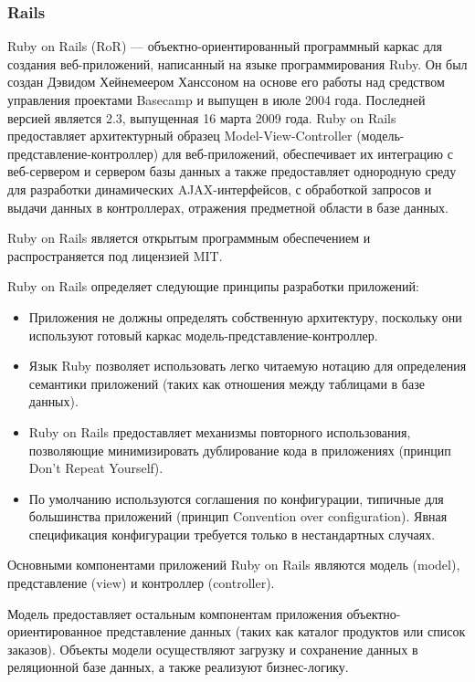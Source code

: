 \subsubsection{Rails}   

Ruby on Rails (RoR) — объектно-ориентированный программный каркас для создания веб-приложений, написанный на языке программирования Ruby. Он был создан Дэвидом Хейнемеером Ханссоном на основе его работы над средством управления проектами Basecamp и выпущен в июле 2004 года. Последней версией является 2.3, выпущенная 16 марта 2009 года. Ruby on Rails предоставляет архитектурный образец Model-View-Controller (модель-представление-контроллер) для веб-приложений, обеспечивает их интеграцию с веб-сервером и сервером базы данных а также предоставляет однородную среду для разработки динамических AJAX-интерфейсов, с обработкой запросов и выдачи данных в контроллерах, отражения предметной области в базе данных.

Ruby on Rails является открытым программным обеспечением и распространяется под лицензией MIT.

Ruby on Rails определяет следующие принципы разработки приложений:
\begin{itemize}
	\item Приложения не должны определять собственную архитектуру, поскольку они используют готовый каркас модель-представление-контроллер.
	\item Язык Ruby позволяет использовать легко читаемую нотацию для определения семантики приложений (таких как отношения между таблицами в базе данных).
	\item Ruby on Rails предоставляет механизмы повторного использования, позволяющие минимизировать дублирование кода в приложениях (принцип Don’t Repeat Yourself).
	\item По умолчанию используются соглашения по конфигурации, типичные для большинства приложений (принцип Convention over configuration). Явная спецификация конфигурации требуется только в нестандартных случаях.
\end{itemize}      

Основными компонентами приложений Ruby on Rails являются модель (model), представление (view) и контроллер (controller).

Модель предоставляет остальным компонентам приложения объектно-ориентированное представление данных (таких как каталог продуктов или список заказов). Объекты модели осуществляют загрузку и сохранение данных в реляционной базе данных, а также реализуют бизнес-логику.

